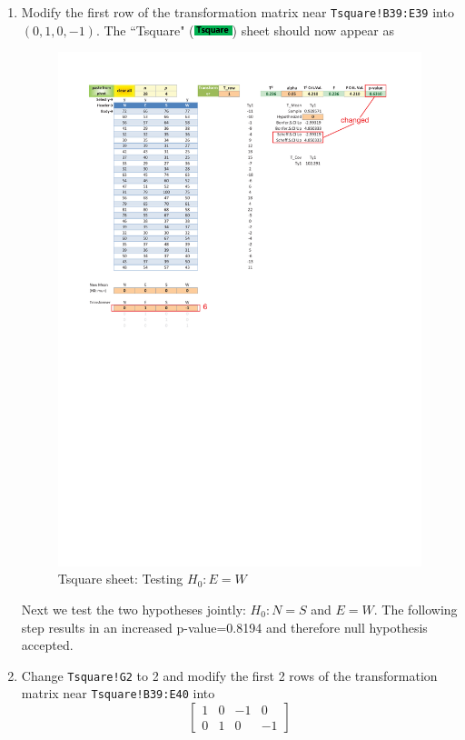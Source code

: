 \documentclass[article]{jss}
\newcommand{\shtTsquare}{``Tsquare" (\includegraphics[height=8pt, keepaspectratio=true]{TsquareSheetTab_png}) }
\begin{document}
\begin{enumerate}
                \item Modify the first row of the transformation matrix near \texttt{Tsquare!B39:E39} into $(0,1,0,-1)$. The \shtTsquare sheet should now appear as
                \begin{figure}[!tbh]
                        \includegraphics[width=\linewidth,keepaspectratio=true]{img/TsquareSheetOutput2_markup}
                        \centering\protect\caption{Tsquare sheet: Testing $H_0: E = W$}
                \end{figure}
                
                
                Next we test the two hypotheses jointly: $H_0: N=S$ and $E=W$. The following step results in an increased p-value=0.8194 and therefore null hypothesis accepted.
                
                \item Change \texttt{Tsquare!G2} to 2 and modify the first 2 rows of the transformation matrix near \texttt{Tsquare!B39:E40} into 
                \[\left[ {\begin{array}{*{20}{c}}
                        1&0&-1&0 \\ 
                        0&1&0&-1
                        \end{array}} \right]\]
                

\end{enumerate}
\end{document}
